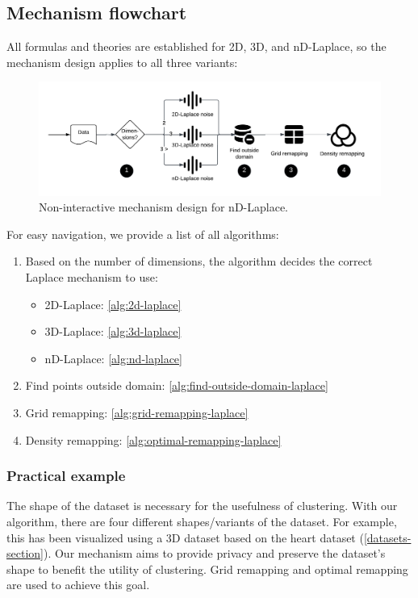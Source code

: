 \subsection{Mechanism flowchart}
All formulas and theories are established for 2D, 3D, and nD-Laplace, so the mechanism design applies to all three variants:
\begin{figure}[h]
  \includegraphics[width=1.1\textwidth]{TheorethicalFramework/ND-Laplace/Images/final-mechanism-design.png}
  \caption{Non-interactive mechanism design for nD-Laplace.}
  \label{fig:final-mechanism-design}
\end{figure}
For easy navigation, we provide a list of all algorithms:
\begin{enumerate}
  \item Based on the number of dimensions, the algorithm decides the correct Laplace mechanism to use:
        \begin{itemize}
          \item 2D-Laplace:  \ref{alg:2d-laplace}
          \item 3D-Laplace: \ref{alg:3d-laplace}
          \item nD-Laplace: \ref{alg:nd-laplace}
        \end{itemize}
  \item Find points outside domain: \ref{alg:find-outside-domain-laplace}
  \item Grid remapping: \ref{alg:grid-remapping-laplace}
  \item Density remapping: \ref{alg:optimal-remapping-laplace}
\end{enumerate}
\subsubsection{Practical example}
The shape of the dataset is necessary for the usefulness of clustering.
With our algorithm, there are four different shapes/variants of the dataset.
For example, this has been visualized using a 3D dataset based on the heart dataset (\ref{datasets-section}).
Our mechanism aims to provide privacy and preserve the dataset's shape to benefit the utility of clustering.
Grid remapping and optimal remapping are used to achieve this goal.


